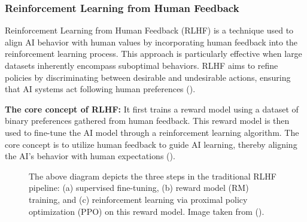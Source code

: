 \documentclass[
  letterpaper,
  numbers=noenddot,
  DIV=11]{scrreprt}
\theoremstyle{definition}
\theoremstyle{plain}
\theoremstyle{plain}
\theoremstyle{remark}
\begin{document}
\subsubsection{Reinforcement Learning from Human
Feedback}\label{reinforcement-learning-from-human-feedback}

Reinforcement Learning from Human Feedback (RLHF) is a technique used to
align AI behavior with human values by incorporating human feedback into
the reinforcement learning process. This approach is particularly
effective when large datasets inherently encompass suboptimal behaviors.
RLHF aims to refine policies by discriminating between desirable and
undesirable actions, ensuring that AI systems act following human
preferences ().

\textbf{The core concept of RLHF:} It first trains a reward model using
a dataset of binary preferences gathered from human feedback. This
reward model is then used to fine-tune the AI model through a
reinforcement learning algorithm. The core concept is to utilize human
feedback to guide AI learning, thereby aligning the AI's behavior with
human expectations ().

\begin{figure}


\caption{\label{fig-toy0}The above diagram depicts the three steps in
the traditional RLHF pipeline: (a) supervised fine-tuning, (b) reward
model (RM) training, and (c) reinforcement learning via proximal policy
optimization (PPO) on this reward model. Image taken from
().}

\end{figure}%
\end{document}
